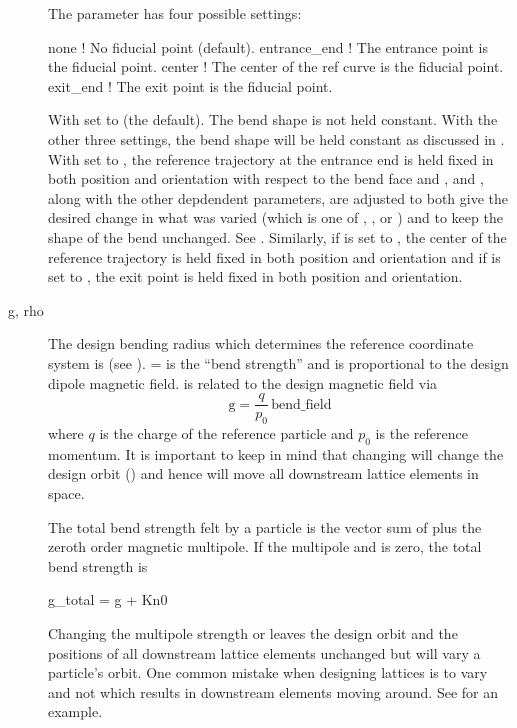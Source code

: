\begin{description}
The  parameter
has four possible settings:
\begin{example}
  none          ! No fiducial point (default).
  entrance_end  ! The entrance point is the fiducial point.
  center        ! The center of the ref curve is the fiducial point.
  exit_end      ! The exit point is the fiducial point.
\end{example}
With  set to  (the default). The bend shape is not held constant. With the
other three settings, the bend shape will be held constant as discussed in .
With  set to , the reference trajectory at the entrance end is held
fixed in both position and orientation with respect to the bend face and ,  and ,
along with the other depdendent parameters, are adjusted to both give the desired change in what was
varied (which is one of , ,  or ) and to keep the shape of the
bend unchanged. See . Similarly, if  is set to , the
center of the reference trajectory is held fixed in both position and orientation and if
 is set to , the exit point is held fixed in both position and
orientation.
  \item[g, rho] \Newline
The design bending radius which determines the reference coordinate system is  (see
).  =  is the ``bend strength'' and is proportional to the design
dipole magnetic field.  is related to the design magnetic field  via
\begin{equation}
  \text{g} = \frac{q}{p_0} \, \text{bend_field} 
  \label{gqpb}
\end{equation}
where $q$ is the charge of the reference particle and $p_0$ is the reference momentum. It is
important to keep in mind that changing  will change the design orbit () and
hence will move all downstream lattice elements in space.

The total bend strength felt by a particle is the vector sum of  plus the zeroth order
magnetic multipole. If the multipole  and  is zero, the total bend strength is
\begin{example}
  g_total = g + Kn0
\end{example}
Changing the multipole strength  or  leaves the design orbit and the positions of
all downstream lattice elements
unchanged but will vary a particle's orbit. One common mistake when designing lattices is to vary
 and not  which results in downstream elements moving around. See 
for an example.


\end{description}
